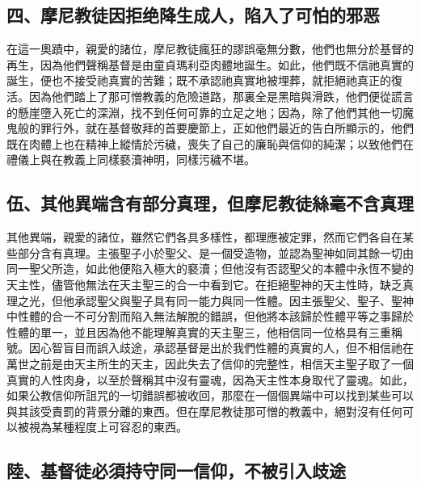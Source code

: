 
\subsection{四、摩尼教徒因拒绝降生成人，陷入了可怕的邪恶}

在這一奧蹟中，親愛的諸位，摩尼教徒瘋狂的謬誤毫無分數，他們也無分於基督的再生，因為他們聲稱基督是由童貞瑪利亞肉體地誕生。如此，他們既不信祂真實的誕生，便也不接受祂真實的苦難；既不承認祂真實地被埋葬，就拒絕祂真正的復活。因為他們踏上了那可憎教義的危險道路，那裏全是黑暗與滑跌，他們便從謊言的懸崖墮入死亡的深淵，找不到任何可靠的立足之地；因為，除了他們其他一切魔鬼般的罪行外，就在基督敬拜的首要慶節上，正如他們最近的告白所顯示的，他們既在肉體上也在精神上縱情於污穢，喪失了自己的廉恥與信仰的純潔；以致他們在禮儀上與在教義上同樣褻瀆神明，同樣污穢不堪。\par


\subsection{伍、其他異端含有部分真理，但摩尼教徒絲毫不含真理}

其他異端，親愛的諸位，雖然它們各具多樣性，都理應被定罪，然而它們各自在某些部分含有真理。主張聖子小於聖父、是一個受造物，並認為聖神如同其餘一切由同一聖父所造，如此他便陷入極大的褻瀆；但他沒有否認聖父的本體中永恆不變的天主性，儘管他無法在天主聖三的合一中看到它。在拒絕聖神的天主性時，缺乏真理之光，但他承認聖父與聖子具有同一能力與同一性體。因主張聖父、聖子、聖神中性體的合一不可分割而陷入無法解脫的錯誤，但他將本該歸於性體平等之事歸於性體的單一，並且因為他不能理解真實的天主聖三，他相信同一位格具有三重稱號。因心智盲目而誤入歧途，承認基督是出於我們性體的真實的人，但不相信祂在萬世之前是由天主所生的天主，因此失去了信仰的完整性，相信天主聖子取了一個真實的人性肉身，以至於聲稱其中沒有靈魂，因為天主性本身取代了靈魂。如此，如果公教信仰所詛咒的一切錯誤都被收回，那麼在一個個異端中可以找到某些可以與其該受責罰的背景分離的東西。但在摩尼教徒那可憎的教義中，絕對沒有任何可以被視為某種程度上可容忍的東西。\par


\subsection{陸、基督徒必須持守同一信仰，不被引入歧途}

